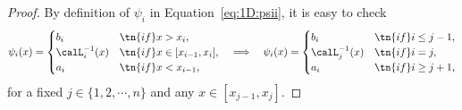 \documentclass[review,hidelinks,onefignum,onetabnum]{siamart250211}
\begin{document}




\begin{proof}%
By definition of $\psi_i$ in Equation~\eqref{eq:1D:psii}, 
it is easy to check
\begin{equation*}%
    \psi_i(x)=\begin{cases}
        b_i &\tn{if  } x>x_{i},\\
        \calL_i^{-1}(x) &\tn{if  }x\in [x_{i-1},x_i],\\
        a_i &\tn{if  }x<x_{i-1},
    \end{cases}
    \quad \Longrightarrow \quad 
        \psi_i(x)=\begin{cases}
        b_i &\tn{if  }i\le j-1,\\
        \calL_j^{-1}(x) &\tn{if  }i= j ,\\
        a_i &\tn{if  }i\ge j+1,
    \end{cases}
\end{equation*}
for a fixed $j\in \{1,2,\cdots,n\}$ and any $x\in [x_{j-1}, x_j]$.

\end{proof}
\end{document}
